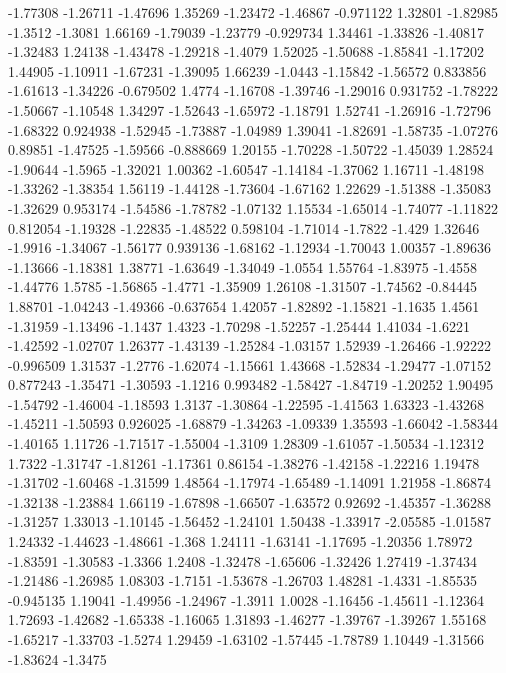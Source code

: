 \documentclass[9pt]{article}
\theoremstyle{plain}
\theoremstyle{definition}
\theoremstyle{remark}
\numberwithin{equation}{section}
\begin{document}
-1.77308
-1.26711
-1.47696
1.35269
-1.23472
-1.46867
-0.971122
1.32801
-1.82985
-1.3512
-1.3081
1.66169
-1.79039
-1.23779
-0.929734
1.34461
-1.33826
-1.40817
-1.32483
1.24138
-1.43478
-1.29218
-1.4079
1.52025
-1.50688
-1.85841
-1.17202
1.44905
-1.10911
-1.67231
-1.39095
1.66239
-1.0443
-1.15842
-1.56572
0.833856
-1.61613
-1.34226
-0.679502
1.4774
-1.16708
-1.39746
-1.29016
0.931752
-1.78222
-1.50667
-1.10548
1.34297
-1.52643
-1.65972
-1.18791
1.52741
-1.26916
-1.72796
-1.68322
0.924938
-1.52945
-1.73887
-1.04989
1.39041
-1.82691
-1.58735
-1.07276
0.89851
-1.47525
-1.59566
-0.888669
1.20155
-1.70228
-1.50722
-1.45039
1.28524
-1.90644
-1.5965
-1.32021
1.00362
-1.60547
-1.14184
-1.37062
1.16711
-1.48198
-1.33262
-1.38354
1.56119
-1.44128
-1.73604
-1.67162
1.22629
-1.51388
-1.35083
-1.32629
0.953174
-1.54586
-1.78782
-1.07132
1.15534
-1.65014
-1.74077
-1.11822
0.812054
-1.19328
-1.22835
-1.48522
0.598104
-1.71014
-1.7822
-1.429
1.32646
-1.9916
-1.34067
-1.56177
0.939136
-1.68162
-1.12934
-1.70043
1.00357
-1.89636
-1.13666
-1.18381
1.38771
-1.63649
-1.34049
-1.0554
1.55764
-1.83975
-1.4558
-1.44776
1.5785
-1.56865
-1.4771
-1.35909
1.26108
-1.31507
-1.74562
-0.84445
1.88701
-1.04243
-1.49366
-0.637654
1.42057
-1.82892
-1.15821
-1.1635
1.4561
-1.31959
-1.13496
-1.1437
1.4323
-1.70298
-1.52257
-1.25444
1.41034
-1.6221
-1.42592
-1.02707
1.26377
-1.43139
-1.25284
-1.03157
1.52939
-1.26466
-1.92222
-0.996509
1.31537
-1.2776
-1.62074
-1.15661
1.43668
-1.52834
-1.29477
-1.07152
0.877243
-1.35471
-1.30593
-1.1216
0.993482
-1.58427
-1.84719
-1.20252
1.90495
-1.54792
-1.46004
-1.18593
1.3137
-1.30864
-1.22595
-1.41563
1.63323
-1.43268
-1.45211
-1.50593
0.926025
-1.68879
-1.34263
-1.09339
1.35593
-1.66042
-1.58344
-1.40165
1.11726
-1.71517
-1.55004
-1.3109
1.28309
-1.61057
-1.50534
-1.12312
1.7322
-1.31747
-1.81261
-1.17361
0.86154
-1.38276
-1.42158
-1.22216
1.19478
-1.31702
-1.60468
-1.31599
1.48564
-1.17974
-1.65489
-1.14091
1.21958
-1.86874
-1.32138
-1.23884
1.66119
-1.67898
-1.66507
-1.63572
0.92692
-1.45357
-1.36288
-1.31257
1.33013
-1.10145
-1.56452
-1.24101
1.50438
-1.33917
-2.05585
-1.01587
1.24332
-1.44623
-1.48661
-1.368
1.24111
-1.63141
-1.17695
-1.20356
1.78972
-1.83591
-1.30583
-1.3366
1.2408
-1.32478
-1.65606
-1.32426
1.27419
-1.37434
-1.21486
-1.26985
1.08303
-1.7151
-1.53678
-1.26703
1.48281
-1.4331
-1.85535
-0.945135
1.19041
-1.49956
-1.24967
-1.3911
1.0028
-1.16456
-1.45611
-1.12364
1.72693
-1.42682
-1.65338
-1.16065
1.31893
-1.46277
-1.39767
-1.39267
1.55168
-1.65217
-1.33703
-1.5274
1.29459
-1.63102
-1.57445
-1.78789
1.10449
-1.31566
-1.83624
-1.3475
\end{document}
